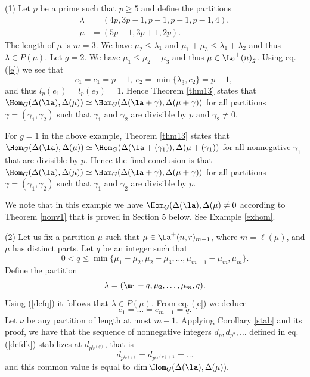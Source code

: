 	\begin{exams}\label{rem14} (1) Let $p$ be a prime such that $p \ge 5$ and define the partitions \begin{align*}\lambda&=(4p, 3p-1, p-1, p-1, p-1, 4), \\ \mu &=(5p-1, 3p+1, 2p). \end{align*} The length of $\mu$ is $m=3$.  We have $\mu_2 \le \lambda_1$ and $\mu_1+\mu_3 \le \lambda_1 + \lambda_2$ and thus $\lambda \in P(\mu)$. Let $g=2$. We have $\mu_1 \le \mu_2+\mu_3$ and thus $\mu \in \La^+(n)_g$. Using eq. (\ref{e}) we see that \[
			e_1 = c_1=p-1, \ e_2 = \min\{\lambda_3, c_2\}=p-1,\  
			\]
	and thus $l_p(e_1)=l_p(e_2)=1$. Hence Theorem \ref{thm13} states that $\Hom_G(\Delta(\la),\Delta(\mu)) \simeq \Hom_{G}(\Delta(\la+\gamma), \Delta(\mu+\gamma))$ for all partitions $\gamma=(\gamma_1, \gamma_2)$ such that $\gamma_1$ and $\gamma_2$ are divisible by $p$ and $\gamma_2 \neq 0$.
	
	For $g=1$ in the above example, Theorem \ref{thm13} states that $\Hom_G(\Delta(\la),\Delta(\mu)) \simeq \Hom_{G}(\Delta(\la+(\gamma_1)), \Delta(\mu+(\gamma_1))$ for all nonnegative $\gamma_1$ that are divisible by $p$. Hence the final conclusion is that $\Hom_G(\Delta(\la),\Delta(\mu)) \simeq \Hom_{G}(\Delta(\la+\gamma), \Delta(\mu+\gamma))$ for all partitions $\gamma=(\gamma_1, \gamma_2)$ such that $\gamma_1$ and $\gamma_2$ are divisible by $p$.
	
	We note that in this example we have  $\Hom_{G}(\Delta(\la), \Delta(\mu) \neq 0$ according to Theorem \ref{nonv1} that is proved in Section 5 below. See Example \ref{exhom}.
	
	(2)	Let us fix a partition $\mu$ such that $\mu \in \La^+(n,r)_{m-1}$, 	where $m=\ell{(\mu) }$, and $\mu$ has distinct parts. Let $q$ be an integer such that \begin{equation}\label{defq}0 < q \le \min\{\mu_1 - \mu_2, \mu_2 - \mu_3, \dots, \mu_{m-1} - \mu_{m}, \mu_{m}\}.\end{equation}
	Define the partition \begin{equation}\label{deflambda}\lambda =(\m_1-q,\mu_2, \dots, \mu_m, q).\end{equation} Using (\ref{defq}) it follows that $\lambda \in P(\mu)$. From eq. (\ref{e}) we deduce \[e_1 = \dots = e_{m-1}=q.\]
	Let $\nu$ be any partition of length at most $m-1$. Applying Corollary \ref{stab} and its proof, we have that the sequence of nonnegative integers $d_p, d_{p^2}, \dots$ defined in eq. (\ref{defdk}) stabilizes at $\label{eqd}d_{p^{l_p(q)}}$, that is \begin{equation}d_{p^{l_p(q)}} = d_{p^{l_p(q)+1}}= \dots \end{equation}
	and this common value is equal to $\dim \Hom_G(\Delta(\la),\Delta(\mu)).$
	

\end{exams}
